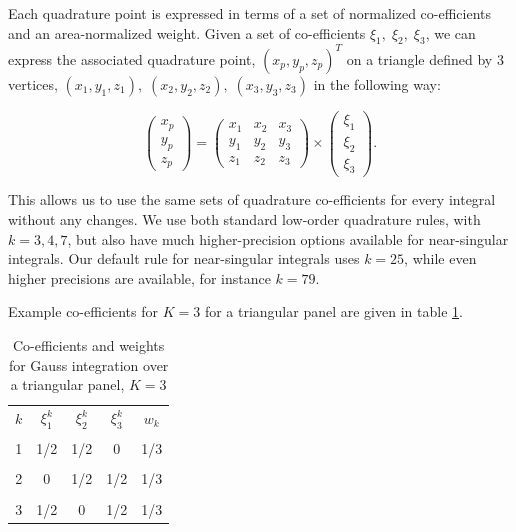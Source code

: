 Each quadrature point is expressed in terms of a set of normalized co-efficients and an area-normalized weight. Given a set of co-efficients $\xi_1,\;\xi_2,\;\xi_3$, we can express the associated quadrature point, $(x_p,y_p,z_p)^{T}$ on a triangle defined by 3 vertices, $(x_1,y_1,z_1),\;(x_2,y_2,z_2),\;(x_3,y_3,z_3)$ in the following way:

\begin{equation}
\left (
	\begin{array}{c}
	x_p \\
	y_p \\
	z_p
	\end{array}
	\right ) = \left ( \begin{array}{ccc}
				x_1 & x_2 & x_3 \\
				y_1 & y_2 & y_3 \\
				z_1 & z_2 & z_3
				\end{array} \right )	\times \left ( \begin{array}{c}
													\xi_1 \\
													\xi_2 \\
													\xi_3
												   \end{array}\right ).
\end{equation}

This allows us to use the same sets of quadrature co-efficients for every integral without any changes. We use both standard low-order quadrature rules, with $k=3,4,7$, but also have much higher-precision options available for near-singular integrals. Our default rule for near-singular integrals uses $k=25$, while even higher precisions are available, for instance $k=79$.

Example co-efficients for $K=3$ for a triangular panel are given in table \ref{tab:gauss_weights_k3}.

\begin{table}[h]
\begin{center}
\begin{tabular}{c|cccc}
 $k$ & $\xi_1^{k}$ & $\xi_2^{k}$ & $\xi_3^{k}$ & $w_k$ \\
  & & & & \\
 1 & 1/2 & 1/2 & 0 & 1/3 \\
  & & & & \\
 2 & 0 & 1/2 & 1/2 & 1/3 \\
  & & & & \\
 3 & 1/2 & 0 & 1/2 & 1/3
 
\end{tabular}
\end{center}
\caption{Co-efficients and weights for Gauss integration over a triangular panel, $K=3$}
\label{tab:gauss_weights_k3}
\end{table}%

